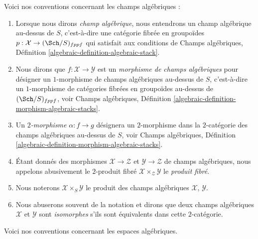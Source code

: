 \medskip\noindent
Voici nos conventions concernant les champs algébriques :
\begin{enumerate}
\item Lorsque nous dirons {\it champ algébrique}, nous entendrons un champ
algébrique au-dessus de $S$, c'est-à-dire une catégorie fibrée en groupoïdes
$p : \mathcal{X} \to (\Sch/S)_{fppf}$
qui satisfait aux conditions de
Champs algébriques, Définition \ref{algebraic-definition-algebraic-stack}.
\item Nous dirons que $f : \mathcal{X} \to \mathcal{Y}$ est un
{\it morphisme de champs algébriques} pour désigner un $1$-morphisme
de champs algébriques au-dessus de $S$, c'est-à-dire un $1$-morphisme de catégories fibrées
en groupoïdes au-dessus de $(\Sch/S)_{fppf}$, voir
Champs algébriques,
Définition \ref{algebraic-definition-morphism-algebraic-stacks}.
\item Un {\it $2$-morphisme} $\alpha : f \to g$ désignera
un $2$-morphisme dans la $2$-catégorie des champs algébriques au-dessus de
$S$, voir
Champs algébriques,
Définition \ref{algebraic-definition-morphism-algebraic-stacks}.
\item Étant donnés des morphismes $\mathcal{X} \to \mathcal{Z}$
et $\mathcal{Y} \to \mathcal{Z}$ de champs algébriques,
nous appelons abusivement le $2$-produit fibré
$\mathcal{X} \times_\mathcal{Z} \mathcal{Y}$ le {\it produit fibré}.
\item Nous noterons $\mathcal{X} \times_S \mathcal{Y}$ le
produit des champs algébriques $\mathcal{X}$, $\mathcal{Y}$.
\item Nous abuserons souvent de la notation et dirons que deux champs algébriques
$\mathcal{X}$ et $\mathcal{Y}$ sont {\it isomorphes} s'ils sont
équivalents dans cette $2$-catégorie.
\end{enumerate}
Voici nos conventions concernant les espaces algébriques.
